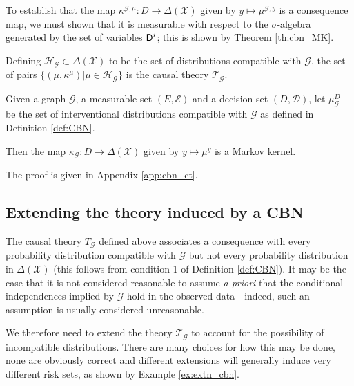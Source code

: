 To establish that the map $\kappa^{\mathcal{G},\mu}:D\to \Delta(\mathcal{X})$ given by $y\mapsto \mu^{\mathcal{G},y}$ is a consequence map, we must shown that it is measurable with respect to the $\sigma$-algebra generated by the set of variables $\mathsf{D}^i$; this is shown by Theorem \ref{th:cbn_MK}. 

Defining $\mathscr{H}_{\mathcal{G}}\subset\Delta(\mathcal{X})$ to be the set of distributions compatible with $\mathcal{G}$, the set of pairs $\{(\mu, \kappa^\mu)|\mu\in \mathscr{H}_{\mathcal{G}}\}$ is the causal theory $\mathscr{T}_\mathcal{G}$.

\begin{theorem}\label{th:cbn_MK}
Given a graph $\mathcal{G}$, a measurable set $(E,\mathcal{E})$ and a decision set $(D,\mathcal{D})$, let $\mu^D_\mathcal{G}$ be the set of interventional distributions compatible with $\mathcal{G}$ as defined in Definition \ref{def:CBN}. 

Then the map $\kappa_{\mathcal{G}}:D\to \Delta(\mathcal{X})$ given by $y\mapsto \mu^y$ is a Markov kernel.
\end{theorem}

The proof is given in Appendix \ref{app:cbn_ct}.



\subsection{Extending the theory induced by a CBN}

The causal theory $T_{\mathcal{G}}$ defined above associates a consequence with every probability distribution compatible with $\mathcal{G}$ but not every probability distribution in $\Delta(\mathcal{X})$ (this follows from condition 1 of Definition \ref{def:CBN}). It may be the case that it is not considered reasonable to assume \emph{a priori} that the conditional independences implied by $\mathcal{G}$ hold in the observed data - indeed, such an assumption is usually considered unreasonable.

We therefore need to extend the theory $\mathscr{T}_{\mathcal{G}}$ to account for the possibility of incompatible distributions. There are many choices for how this may be done, none are obviously correct and different extensions will generally induce very different risk sets, as shown by Example \ref{ex:extn_cbn}.

